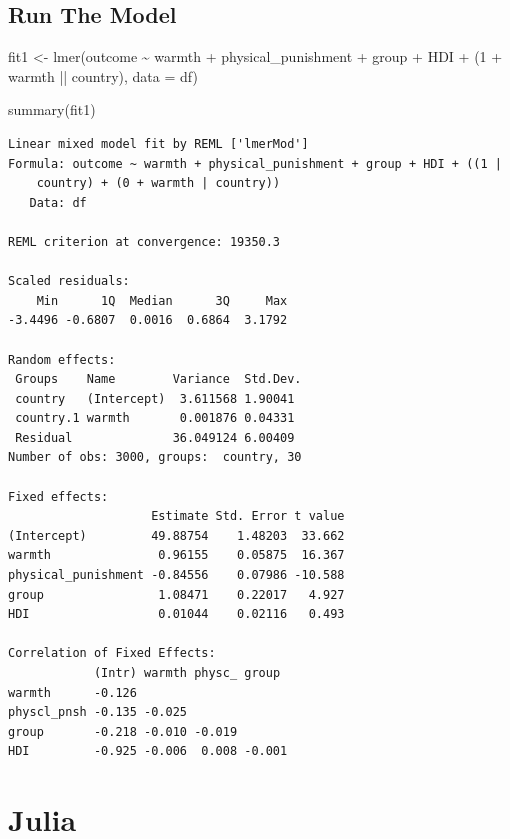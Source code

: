\documentclass[
  letterpaper,
  DIV=11,
  numbers=noendperiod]{scrreprt}
\newenvironment{Shaded}{\begin{snugshade}}{\end{snugshade}}
\newcommand{\AttributeTok}[1]{\textcolor[rgb]{0.40,0.45,0.13}{#1}}
\newcommand{\DecValTok}[1]{\textcolor[rgb]{0.68,0.00,0.00}{#1}}
\newcommand{\FunctionTok}[1]{\textcolor[rgb]{0.28,0.35,0.67}{#1}}
\newcommand{\NormalTok}[1]{\textcolor[rgb]{0.00,0.23,0.31}{#1}}
\newcommand{\OtherTok}[1]{\textcolor[rgb]{0.00,0.23,0.31}{#1}}
\newcommand{\SpecialCharTok}[1]{\textcolor[rgb]{0.37,0.37,0.37}{#1}}
\begin{document}
\subsection{Run The Model}\label{run-the-model-1}

\begin{Shaded}
\begin{Highlighting}[]
\NormalTok{fit1 }\OtherTok{\textless{}{-}} \FunctionTok{lmer}\NormalTok{(outcome }\SpecialCharTok{\textasciitilde{}}\NormalTok{ warmth }\SpecialCharTok{+}\NormalTok{ physical\_punishment }\SpecialCharTok{+} 
\NormalTok{               group }\SpecialCharTok{+}\NormalTok{ HDI }\SpecialCharTok{+}
\NormalTok{               (}\DecValTok{1} \SpecialCharTok{+}\NormalTok{ warmth }\SpecialCharTok{||}\NormalTok{ country),}
             \AttributeTok{data =}\NormalTok{ df)}

\FunctionTok{summary}\NormalTok{(fit1)}
\end{Highlighting}
\end{Shaded}

\begin{verbatim}
Linear mixed model fit by REML ['lmerMod']
Formula: outcome ~ warmth + physical_punishment + group + HDI + ((1 |  
    country) + (0 + warmth | country))
   Data: df

REML criterion at convergence: 19350.3

Scaled residuals: 
    Min      1Q  Median      3Q     Max 
-3.4496 -0.6807  0.0016  0.6864  3.1792 

Random effects:
 Groups    Name        Variance  Std.Dev.
 country   (Intercept)  3.611568 1.90041 
 country.1 warmth       0.001876 0.04331 
 Residual              36.049124 6.00409 
Number of obs: 3000, groups:  country, 30

Fixed effects:
                    Estimate Std. Error t value
(Intercept)         49.88754    1.48203  33.662
warmth               0.96155    0.05875  16.367
physical_punishment -0.84556    0.07986 -10.588
group                1.08471    0.22017   4.927
HDI                  0.01044    0.02116   0.493

Correlation of Fixed Effects:
            (Intr) warmth physc_ group 
warmth      -0.126                     
physcl_pnsh -0.135 -0.025              
group       -0.218 -0.010 -0.019       
HDI         -0.925 -0.006  0.008 -0.001
\end{verbatim}

\section{Julia}
\end{document}
